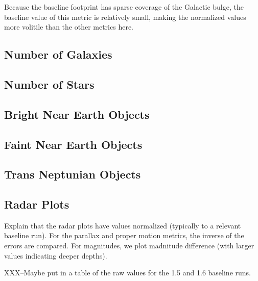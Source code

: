Because the baseline footprint has sparse coverage of the Galactic bulge, the baseline value of this metric is relatively small, making the normalized values more volitile than the other metrics here.

\subsection{Number of Galaxies}

\subsection{Number of Stars}

\subsection{Bright Near Earth Objects}

\subsection{Faint Near Earth Objects}

\subsection{Trans Neptunian Objects}

\subsection{Radar Plots}

Explain that the radar plots have values normalized (typically to a relevant baseline run). For the parallax and proper motion metrics, the inverse of the errors are compared. For magnitudes, we plot madnitude difference (with larger values indicating deeper depths).

XXX--Maybe put in a table of the raw values for the 1.5 and 1.6 baseline runs.